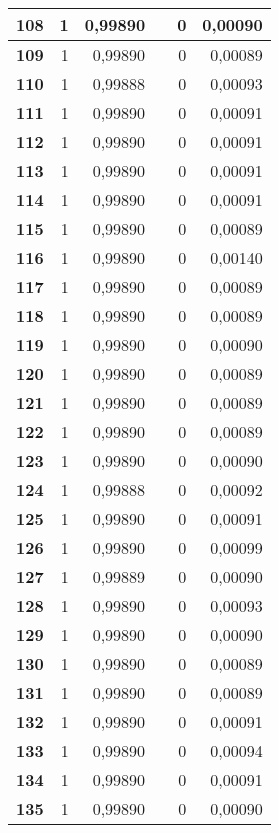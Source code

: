 {\begin{longtable}{|r|r|r|l|r|r|}
\textbf{108} & 1 & 0,99890 &  & 0 & 0,00090 \\ \hline
\textbf{109} & 1 & 0,99890 &  & 0 & 0,00089 \\ \hline
\textbf{110} & 1 & 0,99888 &  & 0 & 0,00093 \\ \hline
\textbf{111} & 1 & 0,99890 &  & 0 & 0,00091 \\ \hline
\textbf{112} & 1 & 0,99890 &  & 0 & 0,00091 \\ \hline
\textbf{113} & 1 & 0,99890 &  & 0 & 0,00091 \\ \hline
\textbf{114} & 1 & 0,99890 &  & 0 & 0,00091 \\ \hline
\textbf{115} & 1 & 0,99890 &  & 0 & 0,00089 \\ \hline
\textbf{116} & 1 & 0,99890 &  & 0 & 0,00140 \\ \hline
\textbf{117} & 1 & 0,99890 &  & 0 & 0,00089 \\ \hline
\textbf{118} & 1 & 0,99890 &  & 0 & 0,00089 \\ \hline
\textbf{119} & 1 & 0,99890 &  & 0 & 0,00090 \\ \hline
\textbf{120} & 1 & 0,99890 &  & 0 & 0,00089 \\ \hline
\textbf{121} & 1 & 0,99890 &  & 0 & 0,00089 \\ \hline
\textbf{122} & 1 & 0,99890 &  & 0 & 0,00089 \\ \hline
\textbf{123} & 1 & 0,99890 &  & 0 & 0,00090 \\ \hline
\textbf{124} & 1 & 0,99888 &  & 0 & 0,00092 \\ \hline
\textbf{125} & 1 & 0,99890 &  & 0 & 0,00091 \\ \hline
\textbf{126} & 1 & 0,99890 &  & 0 & 0,00099 \\ \hline
\textbf{127} & 1 & 0,99889 &  & 0 & 0,00090 \\ \hline
\textbf{128} & 1 & 0,99890 &  & 0 & 0,00093 \\ \hline
\textbf{129} & 1 & 0,99890 &  & 0 & 0,00090 \\ \hline
\textbf{130} & 1 & 0,99890 &  & 0 & 0,00089 \\ \hline
\textbf{131} & 1 & 0,99890 &  & 0 & 0,00089 \\ \hline
\textbf{132} & 1 & 0,99890 &  & 0 & 0,00091 \\ \hline
\textbf{133} & 1 & 0,99890 &  & 0 & 0,00094 \\ \hline
\textbf{134} & 1 & 0,99890 &  & 0 & 0,00091 \\ \hline
\textbf{135} & 1 & 0,99890 &  & 0 & 0,00090 \\ \hline

\end{longtable}}

